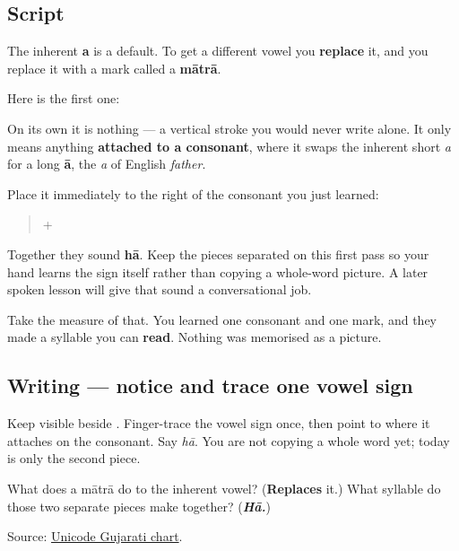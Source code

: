 \subsection*{Script}
The inherent \textbf{a} is a default. To get a different vowel you \textbf{replace} it, and you replace it with a mark called a \textbf{mātrā}.

Here is the first one:

\begin{quote}
\end{quote}

On its own it is nothing — a vertical stroke you would never write alone. It only means anything \textbf{attached to a consonant}, where it swaps the inherent short \emph{a} for a long \textbf{ā}, the \emph{a} of English \emph{father}.

Place it immediately to the right of the consonant you just learned:

\begin{quote}
\textbf{} + \textbf{}
\end{quote}

Together they sound \textbf{hā}. Keep the pieces separated on this first pass so your hand learns the sign itself rather than copying a whole-word picture. A later spoken lesson will give that sound a conversational job.

Take the measure of that. You learned one consonant and one mark, and they made a syllable you can \textbf{read}. Nothing was memorised as a picture.

\subsection*{Writing — notice and trace one vowel sign}

Keep \textbf{} visible beside \textbf{}. Finger-trace the vowel sign once, then point to where it attaches on the consonant. Say \emph{hā}. You are not copying a whole word yet; today is only the second piece.

\begin{tcolorbox}[breakable,colback=teal!4,colframe=teal!35!black,title={Before you move on}]
What does a mātrā do to the inherent vowel? (\textbf{Replaces} it.) What syllable do those two separate pieces make together? (\emph{\textbf{Hā.}})

Source: \href{https://www.unicode.org/charts/PDF/U0A80.pdf}{Unicode Gujarati chart}.
\end{tcolorbox}
